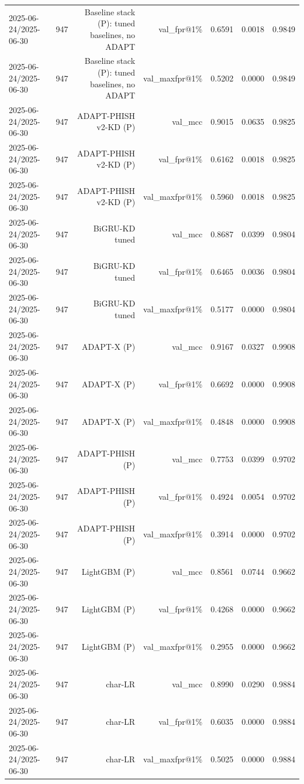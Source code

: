 \begin{table}[t]
\begin{tabular}{llrrrrr}
2025-06-24/2025-06-30 & 947 & Baseline stack (P): tuned baselines, no ADAPT & val\_fpr@1\% & 0.6591 & 0.0018 & 0.9849 \\
2025-06-24/2025-06-30 & 947 & Baseline stack (P): tuned baselines, no ADAPT & val\_maxfpr@1\% & 0.5202 & 0.0000 & 0.9849 \\
2025-06-24/2025-06-30 & 947 & ADAPT-PHISH v2-KD (P) & val\_mcc & 0.9015 & 0.0635 & 0.9825 \\
2025-06-24/2025-06-30 & 947 & ADAPT-PHISH v2-KD (P) & val\_fpr@1\% & 0.6162 & 0.0018 & 0.9825 \\
2025-06-24/2025-06-30 & 947 & ADAPT-PHISH v2-KD (P) & val\_maxfpr@1\% & 0.5960 & 0.0018 & 0.9825 \\
2025-06-24/2025-06-30 & 947 & BiGRU-KD tuned & val\_mcc & 0.8687 & 0.0399 & 0.9804 \\
2025-06-24/2025-06-30 & 947 & BiGRU-KD tuned & val\_fpr@1\% & 0.6465 & 0.0036 & 0.9804 \\
2025-06-24/2025-06-30 & 947 & BiGRU-KD tuned & val\_maxfpr@1\% & 0.5177 & 0.0000 & 0.9804 \\
2025-06-24/2025-06-30 & 947 & ADAPT-X (P) & val\_mcc & 0.9167 & 0.0327 & 0.9908 \\
2025-06-24/2025-06-30 & 947 & ADAPT-X (P) & val\_fpr@1\% & 0.6692 & 0.0000 & 0.9908 \\
2025-06-24/2025-06-30 & 947 & ADAPT-X (P) & val\_maxfpr@1\% & 0.4848 & 0.0000 & 0.9908 \\
2025-06-24/2025-06-30 & 947 & ADAPT-PHISH (P) & val\_mcc & 0.7753 & 0.0399 & 0.9702 \\
2025-06-24/2025-06-30 & 947 & ADAPT-PHISH (P) & val\_fpr@1\% & 0.4924 & 0.0054 & 0.9702 \\
2025-06-24/2025-06-30 & 947 & ADAPT-PHISH (P) & val\_maxfpr@1\% & 0.3914 & 0.0000 & 0.9702 \\
2025-06-24/2025-06-30 & 947 & LightGBM (P) & val\_mcc & 0.8561 & 0.0744 & 0.9662 \\
2025-06-24/2025-06-30 & 947 & LightGBM (P) & val\_fpr@1\% & 0.4268 & 0.0000 & 0.9662 \\
2025-06-24/2025-06-30 & 947 & LightGBM (P) & val\_maxfpr@1\% & 0.2955 & 0.0000 & 0.9662 \\
2025-06-24/2025-06-30 & 947 & char-LR & val\_mcc & 0.8990 & 0.0290 & 0.9884 \\
2025-06-24/2025-06-30 & 947 & char-LR & val\_fpr@1\% & 0.6035 & 0.0000 & 0.9884 \\
2025-06-24/2025-06-30 & 947 & char-LR & val\_maxfpr@1\% & 0.5025 & 0.0000 & 0.9884 \\

\end{tabular}
\end{table}
